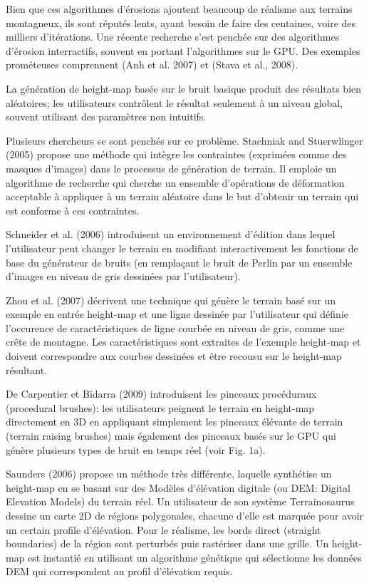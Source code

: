 \documentclass[11pt]{report}
\begin{document}
Bien que ces algorithmes d'érosions ajoutent beaucoup de réalisme aux terrains montagneux, ils sont réputés lents, ayant besoin de faire des centaines, voire des milliers d'itérations. Une récente recherche s'est penchée sur des algorithmes d'érosion interractifs, souvent en portant l'algorithmes sur le GPU. Des exemples prométeuses comprennent (Anh et al. 2007) et (Stava et al., 2008). \newline

La génération de height-map basée sur le bruit basique produit des résultats bien aléatoires; les utilisateurs contrôlent le résultat seulement à un niveau global, souvent utilisant des paramètres non intuitifs. 

Plusieurs chercheurs se sont penchés sur ce problème. Stachniak and Stuerwlinger (2005) propose une méthode qui intègre les contraintes (exprimées comme des masques d'images) dans le processus de génération de terrain. Il emploie un algorithme de recherche qui cherche un ensemble d'opérations de déformation acceptable à appliquer à un terrain aléatoire dans le but d'obtenir un terrain qui est conforme à ces contraintes. 

Schneider et al. (2006) introduisent un environnement d'édition dans lequel l'utilisateur peut changer le terrain en modifiant interactivement les fonctions de base du générateur de bruits (en remplaçant le bruit de Perlin par un ensemble d'images en niveau de gris dessinées par l'utilisateur). 

Zhou et al. (2007) décrivent une technique qui génère le terrain basé sur un exemple en entrée height-map et une ligne dessinée par l'utilisateur qui définie l'occurence de caractéristiques de ligne courbée en niveau de gris, comme une crête de montagne. Les caractéristiques sont extraites de l'exemple height-map et doivent correspondre aux courbes dessinées et être recousu sur le height-map résultant. 

De Carpentier et Bidarra (2009) introduisent les pinceaux procéduraux (procedural brushes): les utilisateurs peignent le terrain en height-map directement en 3D en appliquant simplement les pinceaux élévante de terrain (terrain raising brushes) mais également des pinceaux basés sur le GPU qui génère plusieurs types de bruit en temps réel (voir Fig. 1a). 

Saunders (2006) propose un méthode très différente, laquelle synthétise un height-map en se basant sur des Modèles d'élévation  digitale (ou DEM: Digital Elevation Models) du terrain réel. Un utilisateur de son système Terrainosaurus dessine un carte 2D de régions polygonales, chacune d'elle est marquée pour avoir un certain profile d'élévation. Pour le réalisme, les bords direct (straight boundaries) de la région sont perturbés puis rastériser dans une grille. Un height-map est instantié en utilisant un algorithme génétique qui sélectionne les données DEM qui correspondent au profil d'élévation requis. 
\end{document}
